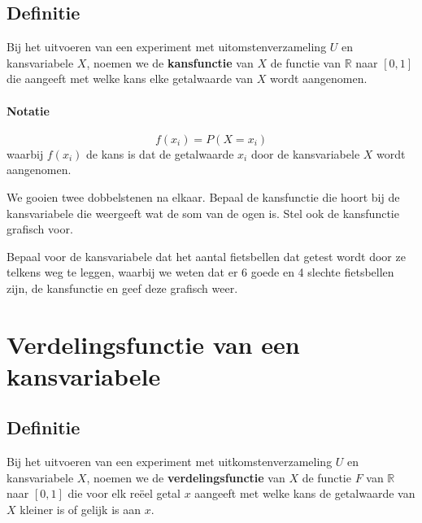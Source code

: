\documentclass[a4paper,12pt, twoside]{article}
\begin{document}
\subsection{Definitie}

\begin{mdframed}
Bij het uitvoeren van een experiment met uitomstenverzameling $U$ en kansvariabele $X$, noemen we de {\bf kansfunctie} van $X$ de functie van $\mathbb{R}$ naar $[0,1]$ die aangeeft met welke kans elke getalwaarde van $X$ wordt aangenomen.
\end{mdframed}

\paragraph*{Notatie}
$$f(x_i)=P(X=x_i)$$
waarbij $f(x_i)$ de kans is dat de getalwaarde $x_i$ door de kansvariabele $X$ wordt aangenomen.

\begin{oefening}
We gooien twee dobbelstenen na elkaar. Bepaal de kansfunctie die hoort bij de kansvariabele die weergeeft wat de som van de ogen is. Stel ook de kansfunctie grafisch voor.
\end{oefening}

\begin{oefening}
Bepaal voor de kansvariabele dat het aantal fietsbellen dat getest wordt door ze telkens weg te leggen, waarbij we weten dat er 6 goede en 4 slechte fietsbellen zijn, de kansfunctie en geef deze grafisch weer.
\end{oefening}

\pagebreak

\section{Verdelingsfunctie van een kansvariabele}

\subsection{Definitie}

\begin{mdframed}
Bij het uitvoeren van een experiment met uitkomstenverzameling $U$ en kansvariabele $X$, noemen we de {\bf verdelingsfunctie} van $X$ de functie $F$ van $\mathbb{R}$ naar $[0,1]$ die voor elk reëel getal $x$ aangeeft met welke kans de getalwaarde van $X$ kleiner is of gelijk is aan $x$.
\end{mdframed}
\end{document}

